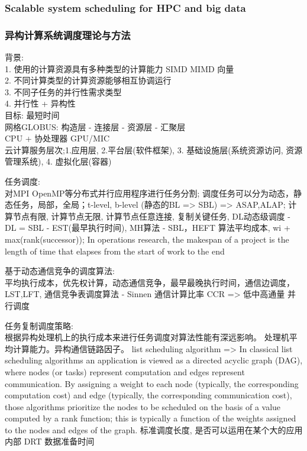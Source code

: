 \documentclass[UTF8]{article}
\begin{document}
    \subsubsection{Scalable system scheduling for HPC and big data}
    \subsubsection{异构计算系统调度理论与方法}
    背景:\\
    1. 使用的计算资源具有多种类型的计算能力 SIMD MIMD 向量 \\
    2. 不同计算类型的计算资源能够相互协调运行 \\
    3. 不同子任务的并行性需求类型 \\
    4. 并行性 + 异构性 \\
    目标: 最短时间\\
    网格GLOBUS: 构造层 - 连接层 - 资源层 - 汇聚层\\
    CPU + 协处理器 GPU/MIC \\
    云计算服务层次;1.应用层, 2.平台层(软件框架), 3. 基础设施层(系统资源访问, 资源管理系统), 4. 虚拟化层(容器)
    
    任务调度:\\对MPI OpenMP等分布式并行应用程序进行任务分割; 调度任务可以分为动态，静态任务，局部，全局；t-level, b-level (静态的BL => SBL)  => ASAP,ALAP; 计算节点有限, 计算节点无限, 计算节点任意连接, 复制关键任务, DL动态级调度 - DL = SBL - EST(最早执行时间), MH算法 - SBL，HEFT 算法平均成本, wi + max(rank(successor)); In operations research, the makespan of a project is the length of time that elapses from the start of work to the end
    
    基于动态通信竞争的调度算法:\\平均执行成本，优先权计算，动态通信竞争，最早最晚执行时间，通信边调度，LST,LFT, 通信竞争表调度算法 - Sinnen 通信计算比率 CCR => 低中高通量 并行调度 
    
    任务复制调度策略: \\ \cite{zhao2003experimental} 根据异构处理机上的执行成本来进行任务调度对算法性能有深远影响。 处理机平均计算能力。异构通信链路因子。 list scheduling algorithm => In classical list scheduling algorithms an application is viewed as a directed acyclic graph (DAG), where nodes (or tasks) represent computation and edges represent communication. By assigning a weight to each node (typically, the corresponding computation cost) and edge (typically, the corresponding communication cost), those algorithms prioritize the nodes to be scheduled on the basis of a value computed by a rank function; this is typically a function of the weights assigned to the nodes and edges of the graph.  标准调度长度,  是否可以运用在某个大的应用内部 DRT 数据准备时间
    
\end{document}
